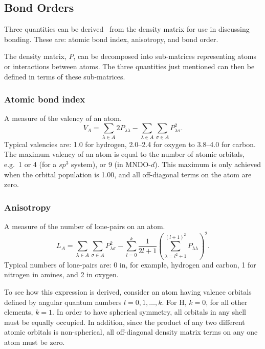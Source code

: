 %
%
\subsection{Bond Orders}\label{bonds}
Three quantities can be derived~\cite{bonds} from the density matrix for use in
discussing bonding.  These are: atomic bond index, anisotropy, and  bond
order. 

The density matrix, $P$, can be decomposed into sub-matrices representing atoms
or interactions between atoms.  The three  quantities just mentioned can then
be defined in terms of these sub-matrices.

\subsubsection{Atomic bond index}
A measure of the valency of an atom.
\begin{equation}
V_A=\sum_{\lambda\in A}2P_{\lambda\lambda}-\sum_{\lambda\in A}\sum_{\sigma\in A}P_{\lambda\sigma}^2.
\end{equation}
Typical valencies are: 1.0 for hydrogen, 2.0--2.4 for oxygen to 3.8--4.0 for
carbon. The maximum valency of an atom is equal to the number of atomic
orbitals, e.g.\  1 or 4 (for a $sp^3$ system), or 9 (in MNDO-$d$). This maximum
is only achieved when the orbital population is 1.00, and all off-diagonal
terms on the atom are zero.

\subsubsection{Anisotropy}
A measure of the number of lone-pairs on an atom.
\begin{equation}
L_A=\sum_{\lambda\in A}\sum_{\sigma\in A}P_{\lambda\sigma}^2 - \sum_{l=0}^{k}
\frac{1}{2l+1}(\sum_{\lambda=l^2+1}^{(l+1)^2}P_{\lambda\lambda})^2.
\end{equation}
Typical numbers of lone-pairs are: 0 in, for example, hydrogen and carbon, 1 for
 nitrogen in amines, and 2 in oxygen.

To see how this expression is derived, consider an atom having valence orbitals
defined by angular quantum numbers $l=0,1,\ldots,k$.  For H, $k=0$, for all
other elements, $k=1$. In order to have spherical symmetry, all orbitals in any
shell must be equally occupied. In addition, since the product of any two
different atomic orbitals is non-spherical, all off-diagonal density matrix
terms on any one atom must be zero.

